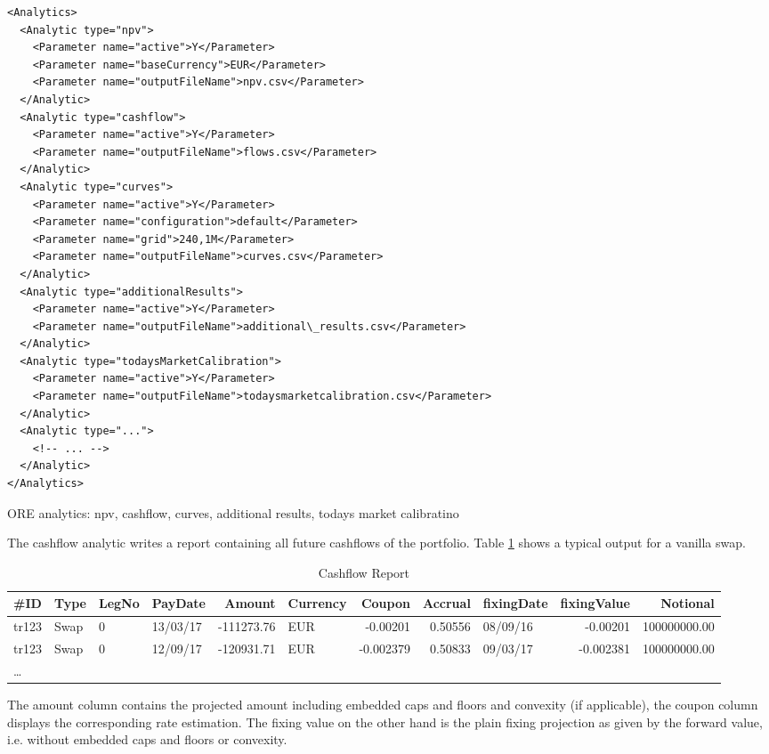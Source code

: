 \documentclass[12pt, a4paper]{article}
\begin{document}
{\begin{listing}[H]
\begin{verbatim}
<Analytics>    
  <Analytic type="npv">
    <Parameter name="active">Y</Parameter>
    <Parameter name="baseCurrency">EUR</Parameter>
    <Parameter name="outputFileName">npv.csv</Parameter>
  </Analytic>      
  <Analytic type="cashflow">
    <Parameter name="active">Y</Parameter>
    <Parameter name="outputFileName">flows.csv</Parameter>
  </Analytic>      
  <Analytic type="curves">
    <Parameter name="active">Y</Parameter>
    <Parameter name="configuration">default</Parameter>
    <Parameter name="grid">240,1M</Parameter>
    <Parameter name="outputFileName">curves.csv</Parameter>
  </Analytic>
  <Analytic type="additionalResults">
    <Parameter name="active">Y</Parameter>
    <Parameter name="outputFileName">additional\_results.csv</Parameter>
  </Analytic> 
  <Analytic type="todaysMarketCalibration">
    <Parameter name="active">Y</Parameter>
    <Parameter name="outputFileName">todaysmarketcalibration.csv</Parameter>
  </Analytic>
  <Analytic type="...">
    <!-- ... -->
  </Analytic>      
</Analytics>      
\end{verbatim}
\caption{ORE analytics: npv, cashflow, curves, additional results, todays market calibratino}
\label{lst:ore_analytics}
\end{listing}

The cashflow analytic writes a report containing all future cashflows of the portfolio. Table \ref{cashflowreport} shows
a typical output for a vanilla swap.

\begin{table}[hbt]
\scriptsize
\begin{center}
  \begin{tabular}{l|l|l|l|r|l|r|r|l|r|r}
\hline
\#ID & Type & LegNo & PayDate & Amount & Currency & Coupon & Accrual & fixingDate & fixingValue & Notional \\
\hline
\hline
tr123 & Swap & 0 & 13/03/17 & -111273.76 & EUR & -0.00201 & 0.50556 & 08/09/16 & -0.00201 & 100000000.00 \\
tr123 & Swap & 0 & 12/09/17 & -120931.71 & EUR & -0.002379 & 0.50833 & 09/03/17 & -0.002381 & 100000000.00 \\
\ldots
\end{tabular}
\caption{Cashflow Report}
\label{cashflowreport}
\end{center}
\end{table}

The amount column contains the projected amount including embedded caps and floors and convexity (if applicable), the
coupon column displays the corresponding rate estimation. The fixing value on the other hand is the plain fixing
projection as given by the forward value, i.e. without embedded caps and floors or convexity.

}
\end{document}
